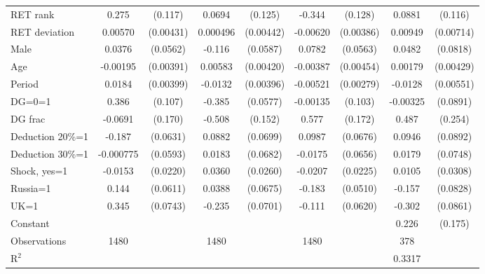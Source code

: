 \begin{tabular}{l|cccccc|cc}
\hline
RET rank        &    0.275\sym{**} &  (0.117)&   0.0694         &  (0.125)&   -0.344\sym{***}&  (0.128)&   0.0881         &  (0.116)\\
RET deviation   &  0.00570         &(0.00431)& 0.000496         &(0.00442)& -0.00620         &(0.00386)&  0.00949         &(0.00714)\\
Male            &   0.0376         & (0.0562)&   -0.116\sym{**} & (0.0587)&   0.0782         & (0.0563)&   0.0482         & (0.0818)\\
Age             & -0.00195         &(0.00391)&  0.00583         &(0.00420)& -0.00387         &(0.00454)&  0.00179         &(0.00429)\\
Period          &   0.0184\sym{***}&(0.00399)&  -0.0132\sym{***}&(0.00396)& -0.00521\sym{*}  &(0.00279)&  -0.0128\sym{**} &(0.00551)\\
DG=0=1          &    0.386\sym{***}&  (0.107)&   -0.385\sym{***}& (0.0577)& -0.00135         &  (0.103)& -0.00325         & (0.0891)\\
DG frac         &  -0.0691         &  (0.170)&   -0.508\sym{***}&  (0.152)&    0.577\sym{***}&  (0.172)&    0.487\sym{*}  &  (0.254)\\
Deduction 20\%=1&   -0.187\sym{***}& (0.0631)&   0.0882         & (0.0699)&   0.0987         & (0.0676)&   0.0946         & (0.0892)\\
Deduction 30\%=1&-0.000775         & (0.0593)&   0.0183         & (0.0682)&  -0.0175         & (0.0656)&   0.0179         & (0.0748)\\
Shock, yes=1    &  -0.0153         & (0.0220)&   0.0360         & (0.0260)&  -0.0207         & (0.0225)&   0.0105         & (0.0308)\\
Russia=1        &    0.144\sym{**} & (0.0611)&   0.0388         & (0.0675)&   -0.183\sym{***}& (0.0510)&   -0.157\sym{*}  & (0.0828)\\
UK=1            &    0.345\sym{***}& (0.0743)&   -0.235\sym{***}& (0.0701)&   -0.111\sym{*}  & (0.0620)&   -0.302\sym{***}& (0.0861)\\
Constant        &                  &         &                  &         &                  &         &    0.226         &  (0.175)\\
\hline
Observations    &     1480         &         &     1480         &         &     1480         &         &      378         &         \\
R$^2$      &                  &         &                  &         &                  &         &       0.3317    &   \\ 

\end{tabular}
